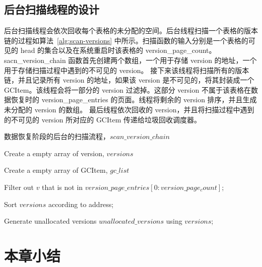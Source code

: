 \subsection{后台扫描线程的设计}
\label{ssec:background-scan}

后台扫描线程会依次回收每个表格的未分配的空间。后台线程扫描一个表格的版本链的过程如算法~\ref{alg:scan-versions} 中所示。扫描函数的输入分别是一个表格的可见的 head 的集合以及在系统重启时该表格的 version\_page\_count。sacn\_version\_chain 函数首先创建两个数组，一个用于存储 version 的地址，一个用于存储扫描过程中遇到的不可见的 version。
接下来该线程将扫描所有的版本链，并且记录所有 version 的地址，如果该 version 是不可见的，将其封装成一个 GCItem。该线程会将一部分的 version 过滤掉。这部分 version 不属于该表格在数据恢复时的 version\_page\_entries 的页面。线程将剩余的 version 排序，并且生成未分配的 version 的数组。
最后线程依次回收的 version，并且将扫描过程中遇到的不可见的 version 所对应的 GCItem 传递给垃圾回收调度器。


\begin{algorithm}[ht]
    \caption{数据恢复阶段的后台的扫描流程，$scan\_version\_chain$}
    \label{alg:scan-versions}
    \BlankLine

    Create a empty array of version, $versions$

    Create a empty array of GCItem, $gc\_list$


    Filter out $v$ that is not in $version\_page\_entries[0:version\_page_count]$;

    Sort $versions$ according to address;


    Generate unallocated versions $unallocated\_versions$ using $versions$;



\end{algorithm}

\section{本章小结}

